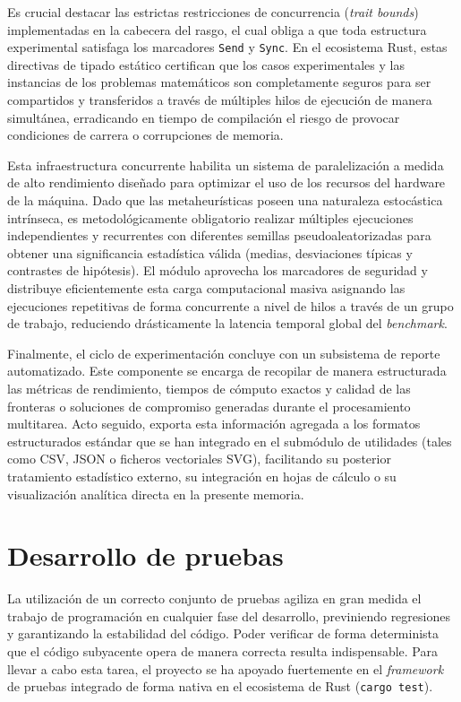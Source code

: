 \documentclass[12pt,a4paper,twoside,openright]{book}
\begin{document}
        Es crucial destacar las estrictas restricciones de concurrencia (\textit{trait bounds}) implementadas en la cabecera del rasgo, el cual obliga a que toda estructura experimental satisfaga los marcadores \texttt{Send} y \texttt{Sync}. En el ecosistema Rust, estas directivas de tipado estático certifican que los casos experimentales y las instancias de los problemas matemáticos son completamente seguros para ser compartidos y transferidos a través de múltiples hilos de ejecución de manera simultánea, erradicando en tiempo de compilación el riesgo de provocar condiciones de carrera o corrupciones de memoria.

        Esta infraestructura concurrente habilita un sistema de paralelización a medida de alto rendimiento diseñado para optimizar el uso de los recursos del hardware de la máquina. Dado que las metaheurísticas poseen una naturaleza estocástica intrínseca, es metodológicamente obligatorio realizar múltiples ejecuciones independientes y recurrentes con diferentes semillas pseudoaleatorizadas para obtener una significancia estadística válida (medias, desviaciones típicas y contrastes de hipótesis). El módulo aprovecha los marcadores de seguridad y distribuye eficientemente esta carga computacional masiva asignando las ejecuciones repetitivas de forma concurrente a nivel de hilos a través de un grupo de trabajo, reduciendo drásticamente la latencia temporal global del \textit{benchmark}.

        Finalmente, el ciclo de experimentación concluye con un subsistema de reporte automatizado. Este componente se encarga de recopilar de manera estructurada las métricas de rendimiento, tiempos de cómputo exactos y calidad de las fronteras o soluciones de compromiso generadas durante el procesamiento multitarea. Acto seguido, exporta esta información agregada a los formatos estructurados estándar que se han integrado en el submódulo de utilidades (tales como CSV, JSON o ficheros vectoriales SVG), facilitando su posterior tratamiento estadístico externo, su integración en hojas de cálculo o su visualización analítica directa en la presente memoria.

        
    \section{Desarrollo de pruebas}
        La utilización de un correcto conjunto de pruebas agiliza en gran medida el trabajo de programación en cualquier fase del desarrollo, previniendo regresiones y garantizando la estabilidad del código. Poder verificar de forma determinista que el código subyacente opera de manera correcta resulta indispensable. Para llevar a cabo esta tarea, el proyecto se ha apoyado fuertemente en el \textit{framework} de pruebas integrado de forma nativa en el ecosistema de Rust (\texttt{cargo test}).
\end{document}
